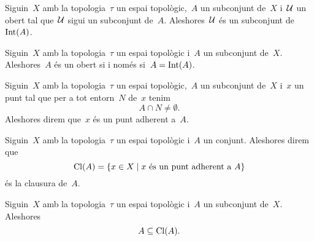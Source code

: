 \documentclass[../../main.tex]{subfiles}
\begin{document}
    \begin{corollary}
        \label{cor:l'interior d'un conjunt conté tots els seus oberts}
        Siguin~\(X\) amb la topologia~\(\tau\) un espai topològic,~\(A\) un subconjunt de~\(X\) i~\(\mathcal{U}\) un obert tal que~\(\mathcal{U}\) sigui un subconjunt de~\(A\).
        Aleshores~\(\mathcal{U}\) és un subconjunt de~\(\operatorname{Int}(A)\).
    \end{corollary}
    \begin{corollary}
        \label{cor:un conjunt és obert si i només si és el seu interior}
        Siguin~\(X\) amb la topologia~\(\tau\) un espai topològic i~\(A\) un subconjunt de~\(X\).
        Aleshores~\(A\) és un obert si i només si~\(A=\operatorname{Int}(A)\).
    \end{corollary}
    \begin{definition}
        \label{def:punt adherent}
        Siguin~\(X\) amb la topologia~\(\tau\) un espai topològic,~\(A\) un subconjunt de~\(X\) i~\(x\) un punt tal que per a tot entorn~\(N\) de~\(x\) tenim
        \[
            A\cap N\neq\emptyset.
        \]
        Aleshores direm que~\(x\) és un punt adherent a~\(A\).
    \end{definition}
    \begin{definition}[Clausura]
        \label{def:clausura}
        Siguin~\(X\) amb la topologia~\(\tau\) un espai topològic i~\(A\) un conjunt.
        Aleshores direm que
        \[
            \operatorname{Cl}(A)=\{x\in X\mid x\text{ és un punt adherent a }A\}
        \]
        és la clausura de~\(A\).
    \end{definition}
    \begin{observation}
        \label{obs:la clausura d'un conjunt conté el conjunt}
        Siguin~\(X\) amb la topologia~\(\tau\) un espai topològic i~\(A\) un subconjunt de~\(X\).
        Aleshores
        \[
            A\subseteq\operatorname{Cl}(A).
        \]
    \end{observation}
\end{document}
